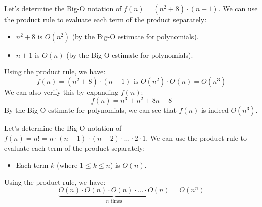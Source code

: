 \begin{eg}
    Let's determine the Big-O notation of $f(n) = (n^2 + 8) \cdot (n + 1)$. We can use the product rule to evaluate each term of the product separately:
    \begin{itemize}[itemsep=1pt,label=$\circ$]
        \item $n^2 + 8$ is $O(n^2)$ (by the Big-O estimate for polynomials).
        \item $n + 1$ is $O(n)$ (by the Big-O estimate for polynomials).
    \end{itemize}
    Using the product rule, we have:
    \[f(n) = (n^2 + 8) \cdot (n + 1) \text{ is } O(n^2) \cdot O(n) = O(n^3)\]
    We can also verify this by expanding $f(n)$:
    \[f(n) = n^3 + n^2 + 8n + 8\]
    By the Big-O estimate for polynomials, we can see that $f(n)$ is indeed $O(n^3)$.
\end{eg}

\begin{eg}
    Let's determine the Big-O notation of $f(n) = n! = n \cdot (n - 1) \cdot (n - 2) \cdot \ldots \cdot 2 \cdot 1$. We can use the product rule to evaluate each term of the product separately:
    \begin{itemize}[itemsep=1pt,label=$\circ$]
        \item Each term $k$ (where $1 \leq k \leq n$) is $O(n)$.
    \end{itemize}
    Using the product rule, we have:
    \[\underbrace{O(n) \cdot O(n) \cdot O(n) \cdot \ldots \cdot O(n)}_{n \text{ times}} = O(n^n)\]
\end{eg}